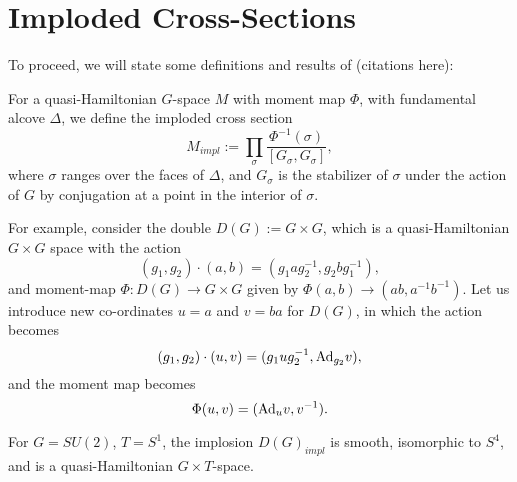 	\section{Imploded Cross-Sections}
	To proceed, we will state some definitions and results of (citations here):
	\begin{definition}
		For a quasi-Hamiltonian $G$-space $M$ with moment map $\Phi$, with fundamental alcove $\Delta$, we define the imploded cross section 
		\begin{equation}
			M_{impl} := \prod_{\sigma} \frac{\Phi^{-1}(\sigma)}{[G_\sigma, G_\sigma]},
		\end{equation}
		where $\sigma$ ranges over the faces of $\Delta$, and $G_\sigma$ is the stabilizer of $\sigma$ under the action of $G$ by conjugation at a point in the interior of $\sigma$.
	\end{definition}
	For example, consider the double $D(G):=G\times G$, which is a quasi-Hamiltonian $G\times G$ space with the action
	\begin{equation}
		(g_1,g_2)\cdot (a,b) = (g_1 a g_2^{-1}, g_2bg_1^{-1}),
	\end{equation}
	and moment-map $\Phi:D(G)\to G\times G$ given by $\Phi(a,b)\to(ab,a^{-1}b^{-1})$. Let us introduce new co-ordinates $u=a$ and $v=ba$ for $D(G)$, in which the action becomes
	\begin{equation}
		(g_1,g_2)\cdot(u,v) = (g_1ug_2^{-1}, \text{Ad}_{g_2} v),
	\end{equation}
	and the moment map becomes
	\begin{equation}
		\Phi(u,v) = (\text{Ad}_u v, v^{-1}).
	\end{equation}
	\begin{theorem}
		For $G=SU(2)$, $T=S^1$, the implosion $D(G)_{impl}$ is smooth, isomorphic to $S^4$, and is a quasi-Hamiltonian $G\times T$-space.
	\end{theorem}
